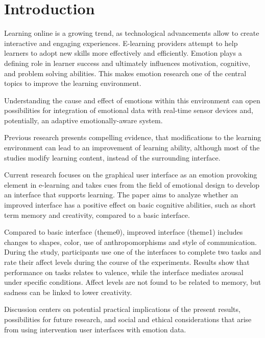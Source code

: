 \section{Introduction}


Learning online is a growing trend, as technological advancements allow to create interactive and engaging experiences. E-learning providers attempt to help learners to adopt new skills more effectively and efficiently. Emotion plays a defining role in learner success and ultimately influences motivation, cognitive, and problem solving abilities. This makes emotion research one of the central topics to improve the learning environment.

Understanding the cause and effect of emotions within this environment can open possibilities for integration of emotional data with real-time sensor devices and, potentially, an adaptive emotionally-aware system.

Previous research presents compelling evidence, that modifications to the learning environment can lead to an improvement of learning ability, although most of the studies modify learning content, instead of the surrounding interface.

Current research focuses on the graphical user interface as an emotion provoking element in e-learning and takes cues from the field of emotional design to develop an interface that supports learning. The paper aims to analyze whether an improved interface has a positive effect on basic cognitive abilities, such as short term memory and creativity, compared to a basic interface.

Compared to basic interface (theme0), improved interface (theme1) includes changes to shapes, color, use of anthropomorphisms and style of communication. During the study, participants use one of the interfaces to complete two tasks and rate their affect levels during the course of the experiments. Results show that performance on tasks relates to valence, while the interface mediates arousal under specific conditions. Affect levels are not found to be related to memory, but sadness can be linked to lower creativity.

Discussion centers on potential practical implications of the present results, possibilities for future research, and social and ethical considerations that arise from using intervention user interfaces with emotion data.



